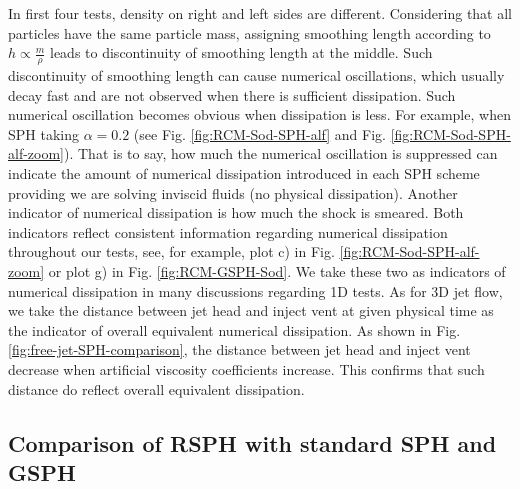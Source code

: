 In first four tests, density on right and left sides are different. Considering that all particles have the same particle mass, assigning smoothing length according to $h \propto \frac{m}{\rho}$ leads to discontinuity of smoothing length at the middle. Such discontinuity of smoothing length can cause numerical oscillations, which usually decay fast and are not observed when there is sufficient dissipation. 
Such numerical oscillation becomes obvious when dissipation is less. For example, when SPH taking $\alpha=0.2$ (see Fig. \ref{fig:RCM-Sod-SPH-alf} and Fig. \ref{fig:RCM-Sod-SPH-alf-zoom}). That is to say, how much the numerical oscillation is suppressed can indicate the amount of numerical dissipation introduced in each SPH scheme providing we are solving inviscid fluids (no physical dissipation).
Another indicator of numerical dissipation is how much the shock is smeared. Both indicators reflect consistent information regarding numerical dissipation throughout our tests, see, for example, plot c) in Fig. \ref{fig:RCM-Sod-SPH-alf-zoom} or plot g) in Fig. \ref{fig:RCM-GSPH-Sod}. 
We take these two as indicators of numerical dissipation in many discussions regarding 1D tests.
As for 3D jet flow, we take the distance between jet head and inject vent at given physical time as the indicator of overall equivalent numerical dissipation. As shown in Fig. \ref{fig:free-jet-SPH-comparison}, the distance between jet head and inject vent decrease when artificial viscosity coefficients increase. This confirms that such distance do reflect overall equivalent dissipation.

\subsection{Comparison of RSPH with standard SPH and GSPH}

